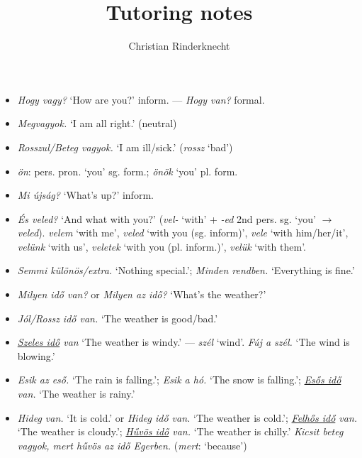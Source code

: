 \documentclass[a4paper,11pt]{article}
\title{Tutoring notes}
\date{\oldstylenums{2026}}
\author{Christian Rinderknecht}
\begin{document}
\maketitle

\begin{itemize}

  \item \emph{Hogy vagy?} `How are you?' inform. --- \emph{Hogy van?}
    formal.

  \item \emph{Megvagyok.} `I am all right.' (neutral)

  \item \emph{Rosszul/Beteg vagyok.} `I am ill/sick.' (\emph{rossz}
    `bad')

  \item \emph{ön}: pers. pron. `you' sg. form.; \emph{önök} `you'
    pl. form.

  \item \emph{Mi újság?} `What's up?' inform.

  \item \emph{És veled?} `And what with you?' (\emph{vel-} `with' +
    \emph{-ed} 2nd pers. sg. `you' $\rightarrow$
    \emph{veled}). \emph{velem} `with me', \emph{veled} `with you
    (sg. inform)', \emph{vele} `with him/her/it', \emph{velünk} `with
    us', \emph{veletek} `with you (pl. inform.)', \emph{velük} `with
    them'.

  \item \emph{Semmi különös/extra.} `Nothing special.'; \emph{Minden
  rendben.} `Everything is fine.'

  \item \emph{Milyen idő van?} or \emph{Milyen az idő?} `What's the
    weather?'

  \item \emph{Jól/Rossz idő van.} `The weather is good/bad.'

  \item \emph{\underline{Szeles idő} van} `The weather is windy.' ---
    \emph{szél} `wind'. \emph{Fúj a szél.} `The wind is blowing.'

  \item \emph{Esik az eső.} `The rain is falling.'; \emph{Esik a hó.}
    `The snow is falling.'; \emph{\underline{Esős idő} van.} `The
    weather is rainy.'

  \item \emph{Hideg van.} `It is cold.' or \emph{Hideg idő van.}  `The
    weather is cold.'; \emph{\underline{Felhős idő} van.} `The weather
    is cloudy.'; \emph{\underline{Hűvös idő} van.} `The weather is
    chilly.' \emph{Kicsit beteg vagyok, mert hűvös az idő Egerben.}
    (\emph{mert}: `because')


\end{itemize}
\end{document}
